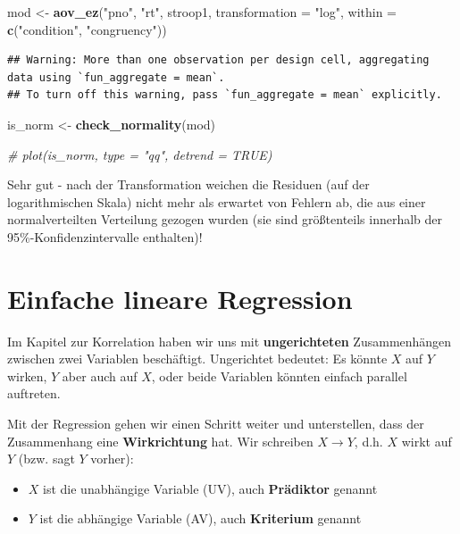 \documentclass[
]{book}
\newenvironment{Shaded}{\begin{snugshade}}{\end{snugshade}}
\newcommand{\AttributeTok}[1]{\textcolor[rgb]{0.13,0.29,0.53}{#1}}
\newcommand{\CommentTok}[1]{\textcolor[rgb]{0.56,0.35,0.01}{\textit{#1}}}
\newcommand{\FunctionTok}[1]{\textcolor[rgb]{0.13,0.29,0.53}{\textbf{#1}}}
\newcommand{\NormalTok}[1]{#1}
\newcommand{\OtherTok}[1]{\textcolor[rgb]{0.56,0.35,0.01}{#1}}
\newcommand{\StringTok}[1]{\textcolor[rgb]{0.31,0.60,0.02}{#1}}
\providecommand{\tightlist}{%
  \setlength{\itemsep}{0pt}\setlength{\parskip}{0pt}}
\begin{document}
\begin{Shaded}
\begin{Highlighting}[]
\NormalTok{mod }\OtherTok{\textless{}{-}} \FunctionTok{aov\_ez}\NormalTok{(}\StringTok{"pno"}\NormalTok{, }\StringTok{"rt"}\NormalTok{, stroop1,}
             \AttributeTok{transformation =} \StringTok{"log"}\NormalTok{,}
             \AttributeTok{within =} \FunctionTok{c}\NormalTok{(}\StringTok{"condition"}\NormalTok{, }\StringTok{"congruency"}\NormalTok{))}
\end{Highlighting}
\end{Shaded}

\begin{verbatim}
## Warning: More than one observation per design cell, aggregating data using `fun_aggregate = mean`.
## To turn off this warning, pass `fun_aggregate = mean` explicitly.
\end{verbatim}

\begin{Shaded}
\begin{Highlighting}[]
\NormalTok{is\_norm }\OtherTok{\textless{}{-}} \FunctionTok{check\_normality}\NormalTok{(mod)}

\CommentTok{\# plot(is\_norm, type = "qq", detrend = TRUE)}
\end{Highlighting}
\end{Shaded}

Sehr gut - nach der Transformation weichen die Residuen (auf der logarithmischen Skala) nicht mehr als erwartet von Fehlern ab, die aus einer normalverteilten Verteilung gezogen wurden (sie sind größtenteils innerhalb der 95\%-Konfidenzintervalle enthalten)!

\chapter{Einfache lineare Regression}\label{einfache-lineare-regression}

Im Kapitel zur Korrelation haben wir uns mit \textbf{ungerichteten} Zusammenhängen zwischen zwei Variablen beschäftigt. Ungerichtet bedeutet: Es könnte \(X\) auf \(Y\) wirken, \(Y\) aber auch auf \(X\), oder beide Variablen könnten einfach parallel auftreten.

Mit der Regression gehen wir einen Schritt weiter und unterstellen, dass der Zusammenhang eine \textbf{Wirkrichtung} hat. Wir schreiben \(X \rightarrow Y\), d.h. \(X\) wirkt auf \(Y\) (bzw. sagt \(Y\) vorher):

\begin{itemize}
\tightlist
\item
  \(X\) ist die unabhängige Variable (UV), auch \textbf{Prädiktor} genannt
\item
  \(Y\) ist die abhängige Variable (AV), auch \textbf{Kriterium} genannt
\end{itemize}
\end{document}
